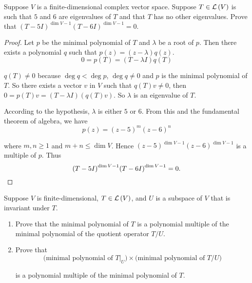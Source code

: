 \begin{exercise}
    Suppose $V$ is a finite-dimensional complex vector space. Suppose $T\in\mathcal{L}\left({V}\right)$ is such that $5$ and $6$ are eigenvalues of $T$ and that $T$ has no other eigenvalues. Prove that ${(T - 5I)}^{\dim V - 1}{(T - 6I)}^{\dim V - 1} = 0$.
\end{exercise}

\begin{proof}
    Let $p$ be the minimal polynomial of $T$ and $\lambda$ be a root of $p$. Then there exists a polynomial $q$ such that $p(z) = (z - \lambda)q(z)$.
    \[
        0 = p(T) = (T - \lambda I)q(T)
    \]

    $q(T)\ne 0$ because $\deg q < \deg p$, $\deg q\ne 0$ and $p$ is the minimal polynomial of $T$. So there exists a vector $v$ in $V$ such that $q(T)v\ne 0$, then $0 = p(T)v = (T - \lambda I)(q(T)v)$. So $\lambda$ is an eigenvalue of $T$.

    According to the hypothesis, $\lambda$ is either $5$ or $6$. From this and the fundamental theorem of algebra, we have
    \[
        p(z) = {(z - 5)}^{m}{(z - 6)}^{n}
    \]

    where $m, n\geq 1$ and $m + n \leq \dim V$. Hence ${(z - 5)}^{\dim V - 1}{(z - 6)}^{\dim V - 1}$ is a multiple of $p$. Thus
    \[
        {(T - 5I)}^{\dim V - 1}{(T - 6I)}^{\dim V - 1} = 0.\qedhere
    \]
\end{proof}
\newpage

\begin{exercise}\label{chapter5:sectionB:exercise25}
    Suppose $V$ is finite-dimensional, $T\in\mathcal{L}\left({V}\right)$, and $U$ is a subspace of $V$ that is invariant under $T$.
    \begin{enumerate}[label={(\alph*)}]
        \item Prove that the minimal polynomial of $T$ is a polynomial multiple of the minimal polynomial of the quotient operator $T/U$.
        \item Prove that
              \[
                  \text{(minimal polynomial of $T\vert_{U}$)}\times\text{(minimal polynomial of $T/U$)}
              \]

              is a polynomial multiple of the minimal polynomial of $T$.
    \end{enumerate}
\end{exercise}

